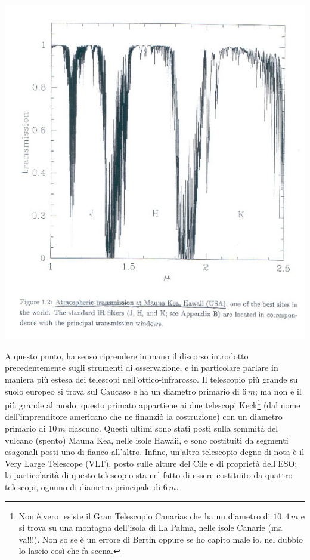 \begin{minipage}{.55\textwidth}
	\centering
	\includegraphics[width=1\textwidth]{Img/bertin_4.png}
\end{minipage}

\vspace{0.2cm}

A questo punto, ha senso riprendere in mano il discorso introdotto precedentemente sugli strumenti di osservazione, e in particolare parlare in maniera più estesa dei telescopi nell'ottico-infrarosso. Il telescopio  più grande su suolo europeo si trova sul Caucaso e ha un diametro primario di $6 \, m$; ma non è il più grande al modo: questo primato appartiene ai due telescopi Keck\footnote{Non è vero, esiste il Gran Telescopio Canarias che ha un diametro di $10,4 \, m$ e si trova su una montagna dell'isola di La Palma, nelle isole Canarie (ma va!!!). Non so se è un errore di Bertin oppure se ho capito male io, nel dubbio lo lascio così che fa scena.} (dal nome dell'imprenditore americano che ne finanziò la costruzione) con un diametro primario di $10 \, m$ ciascuno. Questi ultimi sono stati posti sulla sommità del vulcano (spento) Mauna Kea, nelle isole Hawaii, e sono costituiti da segmenti esagonali posti uno di fianco all'altro. Infine, un'altro telescopio degno di nota è il Very Large Telescope (VLT), posto sulle alture del Cile e di proprietà dell'ESO; la particolarità di questo telescopio sta nel fatto di essere costituito da quattro telescopi, ognuno di diametro principale di $6 \, m$.

